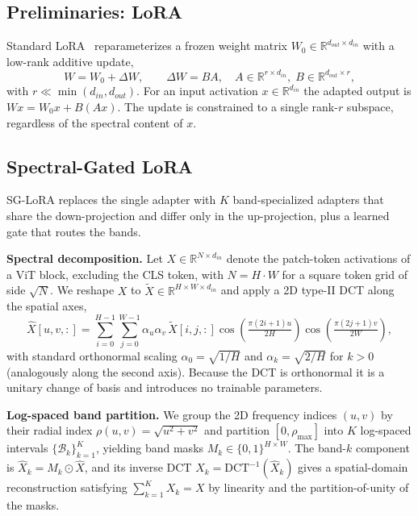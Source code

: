 \documentclass{article}
\begin{document}
\subsection{Preliminaries: LoRA}

Standard LoRA~ reparameterizes a frozen weight matrix $W_0 \in \mathbb{R}^{d_{out} \times d_{in}}$ with a low-rank additive update,
\begin{equation}
W = W_0 + \Delta W, \qquad \Delta W = B A, \quad A \in \mathbb{R}^{r \times d_{in}}, \; B \in \mathbb{R}^{d_{out} \times r},
\end{equation}
with $r \ll \min(d_{in}, d_{out})$. For an input activation $x \in \mathbb{R}^{d_{in}}$ the adapted output is $Wx = W_0 x + B(Ax)$. The update is constrained to a single rank-$r$ subspace, regardless of the spectral content of $x$.

\subsection{Spectral-Gated LoRA}

SG-LoRA replaces the single adapter with $K$ band-specialized adapters that share the down-projection and differ only in the up-projection, plus a learned gate that routes the bands.

\textbf{Spectral decomposition.} Let $X \in \mathbb{R}^{N \times d_{in}}$ denote the patch-token activations of a ViT block, excluding the CLS token, with $N = H \cdot W$ for a square token grid of side $\sqrt{N}$. We reshape $X$ to $\tilde{X} \in \mathbb{R}^{H \times W \times d_{in}}$ and apply a 2D type-II DCT along the spatial axes,
\begin{equation}
\hat{X}[u, v, :] = \sum_{i=0}^{H-1} \sum_{j=0}^{W-1} \alpha_u \alpha_v \, \tilde{X}[i, j, :] \cos\!\left(\tfrac{\pi (2i+1) u}{2H}\right) \cos\!\left(\tfrac{\pi (2j+1) v}{2W}\right),
\end{equation}
with standard orthonormal scaling $\alpha_0 = \sqrt{1/H}$ and $\alpha_k = \sqrt{2/H}$ for $k > 0$ (analogously along the second axis). Because the DCT is orthonormal it is a unitary change of basis and introduces no trainable parameters.

\textbf{Log-spaced band partition.} We group the 2D frequency indices $(u, v)$ by their radial index $\rho(u, v) = \sqrt{u^2 + v^2}$ and partition $[0, \rho_{\max}]$ into $K$ log-spaced intervals $\{\mathcal{B}_k\}_{k=1}^{K}$, yielding band masks $M_k \in \{0, 1\}^{H \times W}$. The band-$k$ component is $\hat{X}_k = M_k \odot \hat{X}$, and its inverse DCT $X_k = \mathrm{DCT}^{-1}(\hat{X}_k)$ gives a spatial-domain reconstruction satisfying $\sum_{k=1}^{K} X_k = X$ by linearity and the partition-of-unity of the masks.
\end{document}
